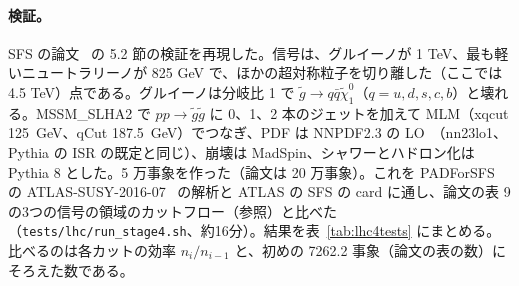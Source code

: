 \documentclass[a4paper,10pt]{ltjsarticle}
\begin{document}
\paragraph{検証。}SFS の論文~\cite{sfs} の 5.2 節の検証を再現した。信号は、グルイーノが 1 TeV、最も軽いニュートラリーノが 825 GeV で、ほかの超対称粒子を切り離した（ここでは 4.5 TeV）点である。グルイーノは分岐比 1 で $\tilde g\to q\bar q\tilde\chi^0_1$（$q=u,d,s,c,b$）と壊れる。MSSM\_SLHA2 で $pp\to\tilde g\tilde g$ に 0、1、2 本のジェットを加えて MLM（xqcut 125~GeV、qCut 187.5~GeV）でつなぎ、PDF は NNPDF2.3 の LO~\cite{nnpdf23}（nn23lo1、Pythia の ISR の既定と同じ）、崩壊は MadSpin、シャワーとハドロン化は Pythia 8 とした。5 万事象を作った（論文は 20 万事象）。これを PADForSFS の ATLAS-SUSY-2016-07~\cite{atlas1607} の解析と ATLAS の SFS の card に通し、論文の表 9 の3つの信号の領域のカットフロー（参照）と比べた（\nolinkurl{tests/lhc/run_stage4.sh}、約16分）。結果を表~\ref{tab:lhc4tests} にまとめる。比べるのは各カットの効率 $n_i/n_{i-1}$ と、初めの 7262.2 事象（論文の表の数）にそろえた数である。
\end{document}
